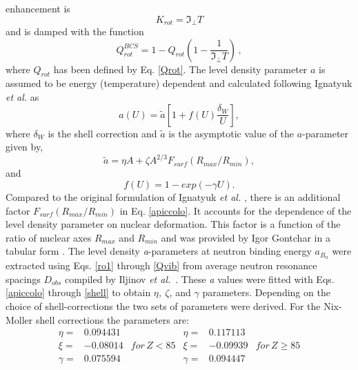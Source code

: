 \documentclass[twocolumn,amsmath,amssymb,10pt,groupedaddress,a4paper]{revtex4}
\begin{document}
enhancement is
\begin{equation}
K_{rot}=\Im_{\perp}T\label{KrotBCS}
\end{equation}
and is damped with the function
\begin{equation}
Q_{rot}^{BCS}=1-Q_{rot}\left(1-\frac{1}{\Im_{\perp}T}\right)\,,\label{QrotBCS}
\end{equation}
\noindent where $Q_{rot}$ has been defined by Eq. \ref{Qrot}.
The level density
parameter $a$ is assumed to be energy (temperature)
dependent and calculated following Ignatyuk \emph{et al.} \cite{ignaa}
as
\begin{equation}
a(U)=\widetilde{a}[1+f(U)\frac{\delta_{W}}{U}],\label{apiccolo}
\end{equation}
\noindent where $\delta_{W}$ is the shell correction and $\widetilde{a}$ is
the asymptotic value of the $a$-parameter given by,
\begin{equation}
\widetilde{a}=\eta A+\zeta A^{2/3}F_{surf}(R_{max}/R_{min}),\label{aassym}
\end{equation}
and
\begin{equation}
f(U)=1-exp(-\gamma U).\label{shell}
\end{equation}
Compared to the original formulation of Ignatyuk \emph{et al.} \cite{ignaa},
there is an additional factor $F_{surf}(R_{max}/R_{min})$ in Eq.
\ref{apiccolo}. It accounts for the dependence of the level density
parameter on nuclear deformation. This factor is a function of the
ratio of nuclear axes $R_{max}$ and $R_{min}$ and was provided by
Igor Gontchar \cite{gontchar} in a tabular form .
The level density \emph{a}-parameters at neutron binding energy $a_{B_{n}}$
were extracted using Eqs. \ref{ro1} through \ref{Qvib} from average
neutron resonance spacings $D_{obs}$ compiled by Iljinov {\it et al.}~\cite{Mebel}.
These \emph{a} values were fitted with Eqs. \ref{apiccolo} through
\ref{shell} to obtain \emph{$\eta$, $\zeta$,} and \emph{$\gamma$}
parameters. Depending on the choice of shell-corrections the two sets
of parameters were derived. For the Nix-Moller shell corrections \cite{masses}
the parameters are:
\begin{equation}
\begin{array}{ccccccc}
\eta= & 0.094431 &  & \eta= & 0.117113\\
\xi= & -0.08014 & for\, Z<85 & \xi= & -0.09939 & for\, Z\geq85\\
\gamma= & 0.075594 &  & \gamma= & 0.094447\end{array}\end{equation}
\end{document}
